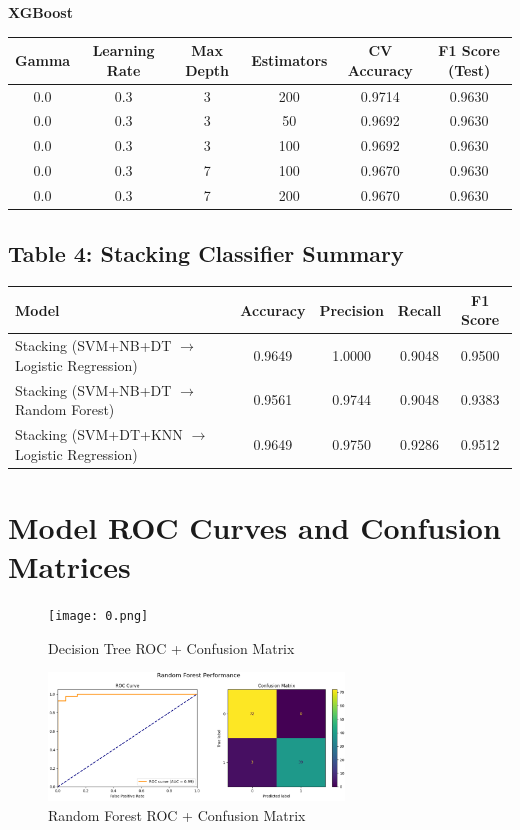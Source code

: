 \documentclass[12pt,a4paper]{article}
\begin{document}
\textbf{XGBoost}
\begin{longtable}{|c|c|c|c|c|c|}
\hline
Gamma & Learning Rate & Max Depth & Estimators & CV Accuracy & F1 Score (Test) \\ \hline
0.0 & 0.3 & 3 & 200 & 0.9714 & 0.9630 \\
0.0 & 0.3 & 3 & 50 & 0.9692 & 0.9630 \\
0.0 & 0.3 & 3 & 100 & 0.9692 & 0.9630 \\
0.0 & 0.3 & 7 & 100 & 0.9670 & 0.9630 \\
0.0 & 0.3 & 7 & 200 & 0.9670 & 0.9630 \\
\hline
\end{longtable}

\clearpage


\subsection*{Table 4: Stacking Classifier Summary}
\begin{longtable}{|>{\raggedright}p{6cm}|c|c|c|c|}
\hline
Model & Accuracy & Precision & Recall & F1 Score \\ \hline
Stacking (SVM+NB+DT $\rightarrow$ Logistic Regression) & 0.9649 & 1.0000 & 0.9048 & 0.9500 \\
Stacking (SVM+NB+DT $\rightarrow$ Random Forest) & 0.9561 & 0.9744 & 0.9048 & 0.9383 \\
Stacking (SVM+DT+KNN $\rightarrow$ Logistic Regression) & 0.9649 & 0.9750 & 0.9286 & 0.9512 \\
\hline
\end{longtable}

\section*{Model ROC Curves and Confusion Matrices}

\begin{figure}[h!]
    \centering
    \texttt{[image: 0.png]}
    \caption{Decision Tree ROC + Confusion Matrix}
\end{figure}

\begin{figure}[h!]
    \centering
    \includegraphics[width=0.7\textwidth]{3.png}
    \caption{Random Forest ROC + Confusion Matrix}
\end{figure}
\end{document}
